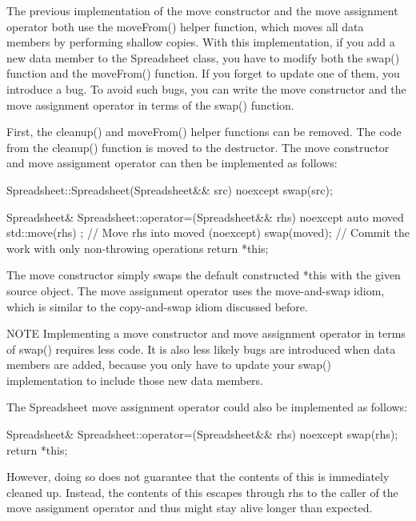 
The previous implementation of the move constructor and the move assignment operator both use the moveFrom() helper function, which moves all data members by performing shallow copies. With this implementation, if you add a new data member to the Spreadsheet class, you have to modify both the swap() function and the moveFrom() function. If you forget to update one of them, you introduce a bug. To avoid such bugs, you can write the move constructor and the move assignment operator in terms of the swap() function.

First, the cleanup() and moveFrom() helper functions can be removed. The code from the cleanup() function is moved to the destructor. The move constructor and move assignment operator can then be implemented as follows:

\begin{cpp}
Spreadsheet::Spreadsheet(Spreadsheet&& src) noexcept
{
    swap(src);
}

Spreadsheet& Spreadsheet::operator=(Spreadsheet&& rhs) noexcept
{
    auto moved { std::move(rhs) }; // Move rhs into moved (noexcept)
    swap(moved); // Commit the work with only non-throwing operations
    return *this;
}
\end{cpp}

The move constructor simply swaps the default constructed *this with the given source object. The move assignment operator uses the move-and-swap idiom, which is similar to the copy-and-swap idiom discussed before.

\begin{myNotic}{NOTE}
Implementing a move constructor and move assignment operator in terms of swap() requires less code. It is also less likely bugs are introduced when data members are added, because you only have to update your swap() implementation to include those new data members.
\end{myNotic}

The Spreadsheet move assignment operator could also be implemented as follows:

\begin{cpp}
Spreadsheet& Spreadsheet::operator=(Spreadsheet&& rhs) noexcept
{
    swap(rhs);
    return *this;
}
\end{cpp}

However, doing so does not guarantee that the contents of this is immediately cleaned up. Instead, the contents of this escapes through rhs to the caller of the move assignment operator and thus might stay alive longer than expected.


